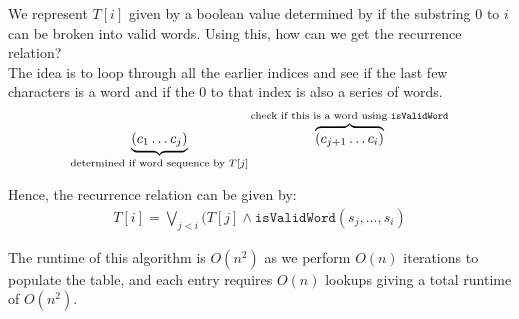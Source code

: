 \documentclass[14pt]{extarticle}
\begin{document}
    \pagebreak

    We represent $T[i]$ given by a boolean value determined by if the
    substring $0$ to $i$ can be broken into valid words. Using this, how
    can we get the recurrence relation?\\

    The idea is to loop through all the earlier indices and see if the
    last few characters is a word and if the $0$ to that index is also a 
    series of words.\\
    \begin{align*}
        \underbrace{(c_1 \ldots c_j)}_{\text{determined if word sequence by
            $T[j]$}}
        \overbrace{(c_{j+1} \ldots c_i)}^{\text{check if this is a word
            using \texttt{isValidWord}}}
    \end{align*}

    Hence, the recurrence relation can be given by:
    \begin{align*}
        T[i] = \bigvee_{j < i} (T[j] \land \texttt{isValidWord}(s_j, \ldots,
        s_i)
    \end{align*}

    The runtime of this algorithm is $O(n^2)$ as we perform $O(n)$ iterations
    to populate the table, and each entry requires $O(n)$ lookups giving a
    total runtime of $O(n^2)$.
\end{document}
